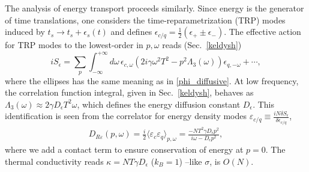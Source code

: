 \documentclass[twocolumn,floatfix,superscriptaddress]{revtex4-1}
\newcommand{\ket}{\rangle}
\newcommand{\bra}{\langle}
\begin{document}
The analysis of energy transport proceeds similarly.  Since energy is the generator of time translations,  one considers the time-reparametrization (TRP) modes induced by $t_s\rightarrow t_s+\epsilon_s(t)$ and defines $\epsilon_{c/q}=\frac{1}{2}(\epsilon_+\pm\epsilon_-)$. 
The effective action for TRP modes to the lowest-order in $p,\omega$ reads (Sec.~\ref{keldysh}) 
\begin{equation}
\label{ep_action}
iS_{\epsilon}=\sum_p\int_{-\infty}^{+\infty}\!\!\! d\omega\,  \epsilon_{c,\omega} ( 2i\gamma\omega^2T^2-p^2\Lambda_3(\omega))\epsilon_{q,-\omega}+\cdots, 
\end{equation}
where the ellipses has the same meaning as in \eqref{phi_diffusive}.  At low frequency, the correlation function integral, given in Sec.~\ref{keldysh}, behaves as $\Lambda_3(\omega)\approx 2\gamma D_{\epsilon}T^2 \omega$, which defines the energy diffusion constant $D_{\epsilon}$.  This identification is seen from the correlator for energy density modes $\varepsilon_{c/q} \equiv \frac{iN\delta S_\epsilon}{\delta \dot\epsilon_{c/q}} $, 
\begin{eqnarray}
D_{R\varepsilon}(p,\omega)=\frac{i}{2}\bra \varepsilon_c\varepsilon_q\ket_{p,\omega}=\frac{-NT^2\gamma D_{\epsilon}p^2}{i\omega-D_{\epsilon}p^2},
\end{eqnarray}
where we add a contact term to ensure conservation of energy at $p=0$.  The thermal conductivity reads $\kappa=NT\gamma D_{\epsilon}$ ($k_B=1$) --like $\sigma$, is $O(N)$.
 
\end{document}
